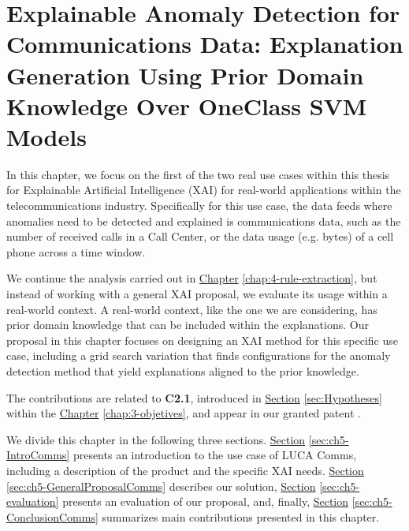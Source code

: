 \chapter{Explainable Anomaly Detection for Communications Data: Explanation Generation Using Prior Domain Knowledge Over OneClass SVM Models} \label{chap:5-comms-xai} 

In this chapter, we focus on the first of the two real use cases within this thesis for Explainable Artificial Intelligence (XAI) for real-world applications within the telecommunications industry. Specifically for this use case, the data feeds where anomalies need to be detected and explained is communications data, such as the number of received calls in a Call Center, or the data usage (e.g. bytes) of a cell phone across a time window.

We continue the analysis carried out in \hyperref[chap:4-rule-extraction]{Chapter} \ref{chap:4-rule-extraction}, but instead of working with a general XAI proposal, we evaluate its usage within a real-world context. A real-world context, like the one we are considering, has prior domain knowledge that can be included within the explanations. Our proposal in this chapter focuses on designing an XAI method for this specific use case, including a grid search variation that finds configurations for the anomaly detection method that yield explanations aligned to the prior knowledge. 

The contributions are related to \textbf{C2.1}, introduced in \hyperref[sec:Hypotheses]{Section} \ref{sec:Hypotheses} within the \hyperref[chap:3-objetives]{Chapter} \ref{chap:3-objetives}, and appear in our granted patent \parencite{patent2019comms}.



We divide this chapter in the following three sections. \hyperref[sec:ch5-IntroComms]{Section} \ref{sec:ch5-IntroComms} presents an introduction to the use case of LUCA Comms, including a description of the product and the specific XAI needs. \hyperref[sec:ch5-GeneralProposalComms]{Section} \ref{sec:ch5-GeneralProposalComms} describes our solution, \hyperref[sec:ch5-evaluation]{Section} \ref{sec:ch5-evaluation} presents an evaluation of our proposal, and, finally, \hyperref[sec:ch5-ConclusionComms]{Section} \ref{sec:ch5-ConclusionComms} summarizes main contributions presented in this chapter.

